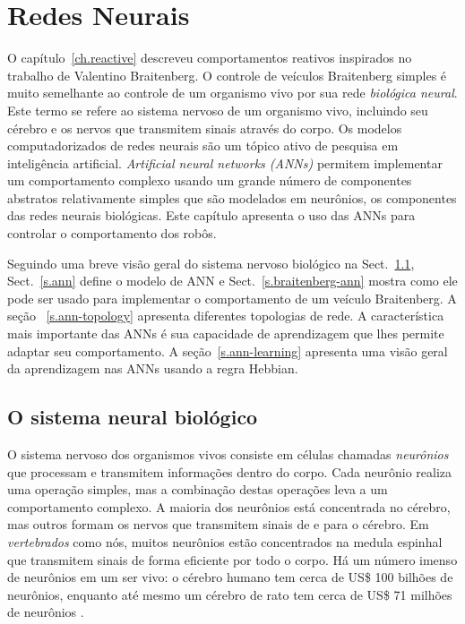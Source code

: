 
\chapter{Redes Neurais}\label{ch.neural}

O capítulo~\ref{ch.reactive} descreveu comportamentos reativos inspirados no trabalho de Valentino Braitenberg. O controle de veículos Braitenberg simples é muito semelhante ao controle de um organismo vivo por sua rede \emph{biológica neural}. Este termo se refere ao sistema nervoso de um organismo vivo, incluindo seu cérebro e os nervos que transmitem sinais através do corpo. Os modelos computadorizados de redes neurais são um tópico ativo de pesquisa em inteligência artificial. \emph{Artificial neural networks (ANNs)} permitem implementar um comportamento complexo usando um grande número de componentes abstratos relativamente simples que são modelados em neurônios, os componentes das redes neurais biológicas. Este capítulo apresenta o uso das ANNs para controlar o comportamento dos robôs.

Seguindo uma breve visão geral do sistema nervoso biológico na Sect.~\ref{s.bio-nn}, Sect.~\ref{s.ann} define o modelo de ANN e Sect.~\ref{s.braitenberg-ann} mostra como ele pode ser usado para implementar o comportamento de um veículo Braitenberg. A seção ~\ref{s.ann-topology} apresenta diferentes topologias de rede. A característica mais importante das ANNs é sua capacidade de aprendizagem que lhes permite adaptar seu comportamento. A seção~\ref{s.ann-learning} apresenta uma visão geral da aprendizagem nas ANNs usando a regra Hebbian.

\section{O sistema neural biológico}\label{s.bio-nn}

O sistema nervoso dos organismos vivos consiste em células chamadas \emph{neurônios} que processam e transmitem informações dentro do corpo. Cada neurônio realiza uma operação simples, mas a combinação destas operações leva a um comportamento complexo. A maioria dos neurônios está concentrada no cérebro, mas outros formam os nervos que transmitem sinais de e para o cérebro. Em \emph{vertebrados} como nós, muitos neurônios estão concentrados na medula espinhal que transmitem sinais de forma eficiente por todo o corpo. Há um número imenso de neurônios em um ser vivo: o cérebro humano tem cerca de US\$ 100 bilhões de neurônios, enquanto até mesmo um cérebro de rato tem cerca de US\$ 71 milhões de neurônios \cite{herculano2009human}. 

